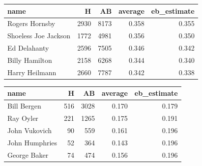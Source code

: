 \documentclass[]{book}
\newenvironment{Shaded}{\begin{snugshade}}{\end{snugshade}}
\newcommand{\CommentTok}[1]{\textcolor[rgb]{0.56,0.35,0.01}{\textit{#1}}}
\newcommand{\DataTypeTok}[1]{\textcolor[rgb]{0.13,0.29,0.53}{#1}}
\newcommand{\DecValTok}[1]{\textcolor[rgb]{0.00,0.00,0.81}{#1}}
\newcommand{\KeywordTok}[1]{\textcolor[rgb]{0.13,0.29,0.53}{\textbf{#1}}}
\newcommand{\NormalTok}[1]{#1}
\newcommand{\OperatorTok}[1]{\textcolor[rgb]{0.81,0.36,0.00}{\textbf{#1}}}
\newcommand{\StringTok}[1]{\textcolor[rgb]{0.31,0.60,0.02}{#1}}
\begin{document}
\begin{Shaded}
\end{Shaded}

\begin{tabular}{l|r|r|r|r}
\hline
name & H & AB & average & eb\_estimate\\
\hline
Rogers Hornsby & 2930 & 8173 & 0.358 & 0.355\\
\hline
Shoeless Joe Jackson & 1772 & 4981 & 0.356 & 0.350\\
\hline
Ed Delahanty & 2596 & 7505 & 0.346 & 0.342\\
\hline
Billy Hamilton & 2158 & 6268 & 0.344 & 0.340\\
\hline
Harry Heilmann & 2660 & 7787 & 0.342 & 0.338\\
\hline
\end{tabular}

\begin{Shaded}
\end{Shaded}

\begin{tabular}{l|r|r|r|r}
\hline
name & H & AB & average & eb\_estimate\\
\hline
Bill Bergen & 516 & 3028 & 0.170 & 0.179\\
\hline
Ray Oyler & 221 & 1265 & 0.175 & 0.191\\
\hline
John Vukovich & 90 & 559 & 0.161 & 0.196\\
\hline
John Humphries & 52 & 364 & 0.143 & 0.196\\
\hline
George Baker & 74 & 474 & 0.156 & 0.196\\
\hline
\end{tabular}
\end{document}

